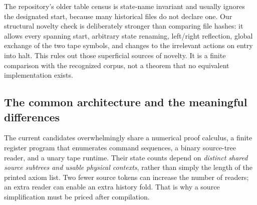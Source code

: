 \documentclass[11pt,a4paper]{article}
\theoremstyle{definition}\newtheorem{definition}[theorem]{Definition}
\theoremstyle{remark}\newtheorem{remark}[theorem]{Remark}
\begin{document}
The repository's older table census is state-name invariant and usually
ignores the designated start, because many historical files do not declare
one. Our structural novelty check is deliberately stronger than comparing
file hashes: it allows every spanning start, arbitrary state renaming,
left/right reflection, global exchange of the two tape symbols, and
changes to the irrelevant actions on entry into halt. This rules out
those superficial sources of novelty. It is a finite comparison with the
recognized corpus, not a theorem that no equivalent implementation exists.

\subsection{The common architecture and the meaningful differences}

The current candidates overwhelmingly share a numerical proof calculus,
a finite register program that enumerates command sequences, a binary
source-tree reader, and a unary tape runtime. Their state counts depend on
\emph{distinct shared source subtrees and usable physical contexts}, rather
than simply the length of the printed axiom list. Two fewer source tokens
can increase the number of readers; an extra reader can enable an extra
history fold. That is why a source simplification must be priced after
compilation.
\end{document}
